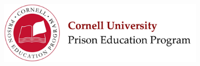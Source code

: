 \documentclass[12pt]{exam}
\begin{document}


\begin{flushright}
\vspace{0.2in}

\end{flushright}

\begin{center}
\includegraphics[width=10cm]{../images/logo.png}
\end{center}


\begin{center}
\end{center}
\vspace{0.2in}

\clearpage
\end{document}
